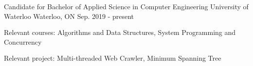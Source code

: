 

\begin{cventries}

  \cventry
    {Candidate for Bachelor of Applied Science in Computer Engineering} %
    {University of Waterloo} %
    {Waterloo, ON} %
    {Sep. 2019 - present} %
    {
      \begin{cvitems} %
        \item {Relevant courses: Algorithms and Data Structures, System Programming and Concurrency}
        \item {
        	Relevant project: Multi-threaded Web Crawler, Minimum Spanning Tree
        }
      \end{cvitems}
    }

\end{cventries}
